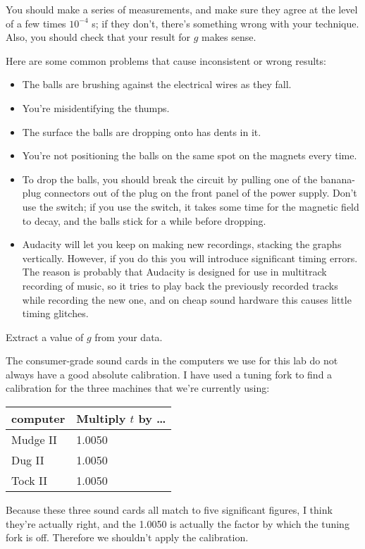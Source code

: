 You should make a series of measurements, and
make sure they agree at the level of a few times $10^{-4}$ s; if they
don't, there's something wrong with your technique. Also, you
should check that your result for $g$ makes sense.

Here are some common problems that cause inconsistent or wrong results:
\begin{itemize}
\item[] The balls are brushing against the electrical wires as they fall.
\item[] You're misidentifying the thumps.
\item[] The surface the balls are dropping onto has dents in it. 
\item[] You're not positioning the balls on the same spot on the magnets every time.
\item[] To drop the balls, you should break the circuit by pulling one of the banana-plug connectors out of the plug on the front
panel of the power supply. Don't use the switch; if you use the switch, it takes some time for the magnetic field to decay, and the balls stick for a while before dropping. 
\item[] Audacity will let you keep on making new recordings, stacking the graphs
vertically. However, if you do this you will introduce significant timing
errors. The reason is probably that Audacity is designed for use in multitrack recording
of music, so it tries to play back the previously recorded tracks while recording the
new one, and on cheap sound hardware this causes little timing glitches.
\end{itemize}

\analysis

Extract a value of $g$ from your data.

The consumer-grade sound cards in the computers we use for this lab do not always have a good absolute calibration.
I have used a tuning fork to find a calibration for the three machines that we're currently using:

\begin{tabular}{ll}
computer & Multiply $t$ by \ldots \\
\hline
Mudge II & 1.0050 \\
Dug II  & 1.0050 \\
Tock II  & 1.0050
\end{tabular}

Because these three sound cards all match to five significant figures, I think they're actually right, and
the 1.0050 is actually the factor by which the tuning fork is off. Therefore we shouldn't apply the
calibration.

